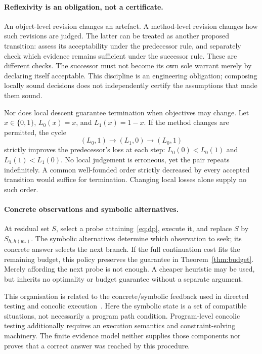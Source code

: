 \documentclass[11pt,letterpaper]{article}
\begin{document}
\paragraph{Reflexivity is an obligation, not a certificate.}
An object-level revision changes an artefact. A method-level revision changes how such revisions are judged. The latter can be treated as another proposed transition: assess its acceptability under the predecessor rule, and separately check which evidence remains sufficient under the successor rule. These are different checks. The successor must not become its own sole warrant merely by declaring itself acceptable. This discipline is an engineering obligation; composing locally sound decisions does not independently certify the assumptions that made them sound.

Nor does local descent guarantee termination when objectives may change. Let $x\in\{0,1\}$, $L_0(x)=x$, and $L_1(x)=1-x$. If the method changes are permitted, the cycle
\[
 (L_0,1)\longrightarrow(L_1,0)\longrightarrow(L_0,1)
\]
strictly improves the predecessor's loss at each step:
$L_0(0)<L_0(1)$ and $L_1(1)<L_1(0)$.
No local judgement is erroneous, yet the pair repeats indefinitely. A common well-founded order strictly decreased by every accepted transition would suffice for termination. Changing local losses alone supply no such order.

\paragraph{Concrete observations and symbolic alternatives.}
At residual set $S$, select a probe attaining~\eqref{eq:dp}, execute it, and replace $S$ by $S_{h,h(w_*)}$. The symbolic alternatives determine which observation to seek; its concrete answer selects the next branch. If the full continuation cost fits the remaining budget, this policy preserves the guarantee in Theorem~\ref{thm:budget}. Merely affording the next probe is not enough. A cheaper heuristic may be used, but inherits no optimality or budget guarantee without a separate argument.

This organisation is related to the concrete/symbolic feedback used in directed testing and concolic execution~\cite{dart,cute,predictive}. Here the symbolic state is a set of compatible situations, not necessarily a program path condition. Program-level concolic testing additionally requires an execution semantics and constraint-solving machinery. The finite evidence model neither supplies those components nor proves that a correct answer was reached by this procedure.
\end{document}
